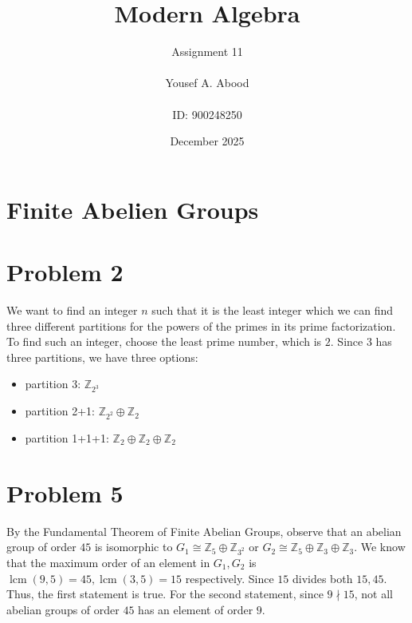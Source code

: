 \documentclass[a4paper,12pt]{article}
\title{Modern Algebra}
\author{Assignment 11\\ \\ Yousef A. Abood\\ \\ ID: 900248250}
\date{December 2025}
\begin{document}
\maketitle
\noindent\makebox[\linewidth]{\rule{15cm}{0.4pt}}
\section{Finite Abelien Groups}
\section*{Problem 2}
We want to find an integer $n$ such that it is the least integer which we can find three different partitions for the powers of the primes in its prime factorization. To find such an integer, choose the least prime number, which is $2$. Since $3$ has three partitions, we have three options:
\begin{itemize}
    \item partition 3: $\mathbb{Z}_{2^3}$
    \item partition 2+1: $\mathbb{Z}_{2^2}\oplus \mathbb{Z}_2$
    \item partition 1+1+1: $\mathbb{Z}_2\oplus \mathbb{Z}_2\oplus \mathbb{Z}_2$
\end{itemize}
\section*{Problem 5}
By the Fundamental Theorem of Finite Abelian Groups, observe that an abelian group of order $45$ is isomorphic to $G_1\cong \mathbb{Z}_5 \oplus \mathbb{Z}_{3^2}$ or $ G_2 \cong \mathbb{Z}_5\oplus \mathbb{Z}_3 \oplus \mathbb{Z}_3.$ We know that the maximum order of an element in $G_1,G_2$ is $\operatorname{lcm}(9,5)=45, \operatorname{lcm}(3,5)=15$ respectively. Since $15$ divides both $15,45$. Thus, the first statement is true. For the second statement, since $9 \nmid 15$, not all abelian groups of order $45$ has an element of order $9.$
\end{document}

